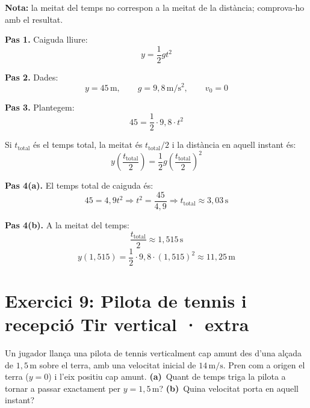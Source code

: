\documentclass[11pt,a4paper]{article}
\begin{document}
\textbf{Nota:} la meitat del temps no correspon a la meitat de la distància; comprova-ho amb el resultat.

\begin{solutionbox}
\textbf{Pas 1.} Caiguda lliure:
\[
y=\frac{1}{2}gt^2
\]

\textbf{Pas 2.} Dades:
\[
y=45\,\mathrm{m}, \qquad g=9{,}8\,\mathrm{m/s^2}, \qquad v_0=0
\]

\textbf{Pas 3.} Plantegem:
\[
45=\frac{1}{2}\cdot 9{,}8\cdot t^2
\]

Si $t_{\text{total}}$ és el temps total, la meitat és $t_{\text{total}}/2$ i la distància en aquell instant és:
\[
y\left(\frac{t_{\text{total}}}{2}\right)=\frac{1}{2}g\left(\frac{t_{\text{total}}}{2}\right)^2
\]

\textbf{Pas 4(a).} El temps total de caiguda és:
\[
45=4{,}9t^2 \Longrightarrow t^2=\frac{45}{4{,}9} \Longrightarrow t_{\text{total}}\approx 3{,}03\,\mathrm{s}
\]

\textbf{Pas 4(b).} A la meitat del temps:
\[
\frac{t_{\text{total}}}{2}\approx 1{,}515\,\mathrm{s}
\]
\[
y(1{,}515)=\frac{1}{2}\cdot 9{,}8\cdot (1{,}515)^2\approx 11{,}25\,\mathrm{m}
\]
\end{solutionbox}

\clearpage

\section*{Exercici 9: Pilota de tennis i recepció \hfill \normalfont Tir vertical · extra}

Un jugador llança una pilota de tennis verticalment cap amunt des d'una alçada de $1{,}5\,\mathrm{m}$ sobre el terra, amb una velocitat inicial de $14\,\mathrm{m/s}$. Pren com a origen el terra ($y=0$) i l'eix positiu cap amunt. \textbf{(a)}~Quant de temps triga la pilota a tornar a passar exactament per $y=1{,}5\,\mathrm{m}$? \textbf{(b)}~Quina velocitat porta en aquell instant?
\end{document}
